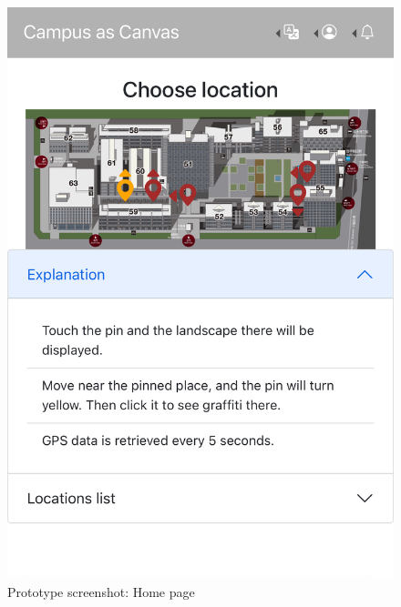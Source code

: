 \begin{figure}
  \begin{minipage}{0.48\textwidth}
    \centering
    \includegraphics[width=0.9\linewidth]{resources/4_methodology/prototype_home.png}
      \caption{Prototype screenshot: Home page}
  \end{minipage}\hfill
  \begin{minipage}{0.48\textwidth}
    \centering

\end{minipage}
\end{figure}
